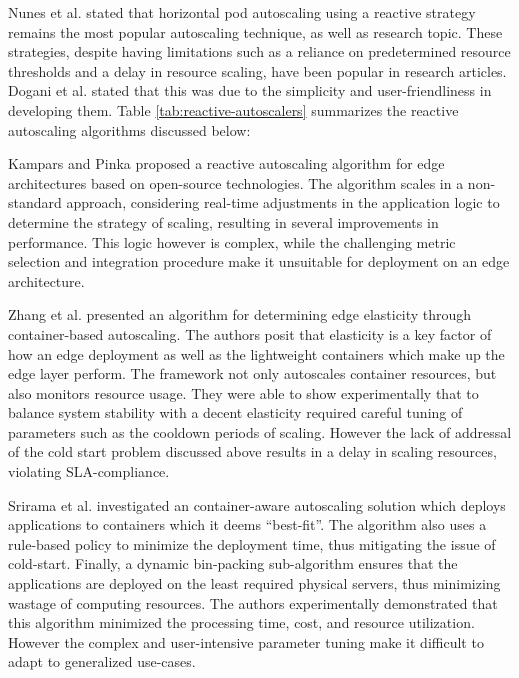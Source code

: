 Nunes et al. \cite{nunes2021state} stated that horizontal pod autoscaling using a reactive strategy remains the most popular autoscaling technique, as well as research topic. These strategies, despite having limitations such as a reliance on predetermined resource thresholds and a delay in resource scaling, have been popular in research articles.  Dogani et al. \cite{dogani2023auto} stated that this was due to the simplicity and user-friendliness in developing them. Table \ref{tab:reactive-autoscalers} summarizes the reactive autoscaling algorithms discussed below:\par

Kampars and Pinka \cite{kampars2017auto} proposed a reactive autoscaling algorithm for edge architectures based on open-source technologies. The algorithm scales in a non-standard approach, considering real-time adjustments in the application logic to determine the strategy of scaling, resulting in several improvements in performance. This logic however is complex, while the challenging metric selection and integration procedure make it unsuitable for deployment on an edge architecture.\par

Zhang et al. \cite{zhang2019quantifying} presented an algorithm for determining edge elasticity through container-based autoscaling. The authors posit that elasticity is a key factor of how an edge deployment as well as the lightweight containers which make up the edge layer perform. The framework not only autoscales container resources, but also monitors resource usage. They were able to show experimentally that to balance system stability with a decent elasticity required careful tuning of parameters such as the cooldown periods of scaling. However the lack of addressal of the cold start problem discussed above results in a delay in scaling resources, violating SLA-compliance.\par


Srirama et al. \cite{srirama2020application} investigated an container-aware autoscaling solution which deploys applications to containers which it deems ``best-fit''. The algorithm also uses a rule-based policy to minimize the deployment time, thus mitigating the issue of cold-start. Finally, a dynamic bin-packing sub-algorithm ensures that the applications are deployed on the least required physical servers, thus minimizing wastage of computing resources. The authors experimentally demonstrated that this algorithm minimized  the processing time, cost, and resource utilization. However the complex and user-intensive parameter tuning make it difficult to adapt to generalized use-cases.\par

